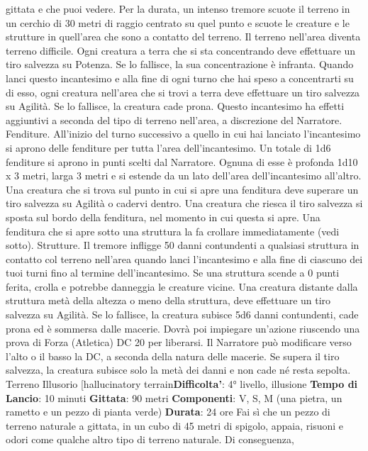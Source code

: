 \begin{multicols}{2}
gittata e che puoi vedere. Per la durata, un intenso
tremore scuote il terreno in un cerchio di 30 metri di
raggio centrato su quel punto e scuote le creature e le
strutture in quell’area che sono a contatto del terreno.
Il terreno nell’area diventa terreno difficile. Ogni
creatura a terra che si sta concentrando deve effettuare
un tiro salvezza su Potenza. Se lo fallisce, la sua
concentrazione è infranta.
Quando lanci questo incantesimo e alla fine di ogni
turno che hai speso a concentrarti su di esso, ogni
creatura nell’area che si trovi a terra deve effettuare un
tiro salvezza su Agilità. Se lo fallisce, la creatura
cade prona.
Questo incantesimo ha effetti aggiuntivi a seconda del
tipo di terreno nell’area, a discrezione del Narratore.
Fenditure. All’inizio del turno successivo a quello in cui
hai lanciato l’incantesimo si aprono delle fenditure per
tutta l’area dell’incantesimo. Un totale di 1d6 fenditure si
aprono in punti scelti dal Narratore. Ognuna di esse è
profonda 1d10 x 3 metri, larga 3 metri e si estende da
un lato dell’area dell’incantesimo all’altro. Una creatura
che si trova sul punto in cui si apre una fenditura deve
superare un tiro salvezza su Agilità o cadervi
dentro. Una creatura che riesca il tiro salvezza si sposta
sul bordo della fenditura, nel momento in cui questa si
apre.
Una fenditura che si apre sotto una struttura la fa
crollare immediatamente (vedi sotto).
Strutture. Il tremore infligge 50 danni contundenti a
qualsiasi struttura in contatto col terreno nell’area
quando lanci l’incantesimo e alla fine di ciascuno dei
tuoi turni fino al termine dell’incantesimo. Se una
struttura scende a 0 punti ferita, crolla e potrebbe
danneggia le creature vicine. Una creatura distante
dalla struttura metà della altezza o meno della struttura,
deve effettuare un tiro salvezza su Agilità. Se lo
fallisce, la creatura subisce 5d6 danni contundenti,
cade prona ed è sommersa dalle macerie. Dovrà poi
impiegare un’azione riuscendo una prova di Forza
(Atletica) DC 20 per liberarsi. Il Narratore può modificare
verso l’alto o il basso la DC, a seconda della natura
delle macerie. Se supera il tiro salvezza, la creatura
subisce solo la metà dei danni e non cade né resta
sepolta.
Terreno Illusorio
[hallucinatory terrain\textbf{Difficolta'}:
4° livello, illusione
\textbf{Tempo di Lancio}: 10 minuti
\textbf{Gittata}: 90 metri
\textbf{Componenti}: V, S, M (una pietra, un rametto e un
pezzo di pianta verde)
\textbf{Durata}: 24 ore
Fai sì che un pezzo di terreno naturale a gittata, in un
cubo di 45 metri di spigolo, appaia, risuoni e odori come
qualche altro tipo di terreno naturale. Di conseguenza,

\end{multicols}
